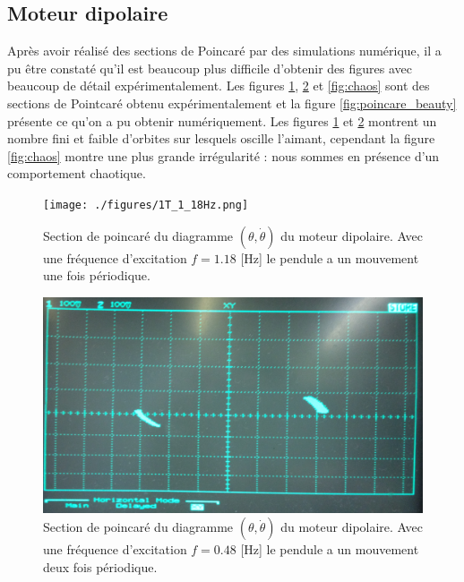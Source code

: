\documentclass[a4paper,12pt,oneside]{article}
\begin{document}
\subsection{Moteur dipolaire}

Après avoir réalisé des sections de Poincaré par des simulations numérique, il a pu être constaté qu'il est beaucoup plus difficile d'obtenir des figures avec beaucoup de détail expérimentalement. Les figures \ref{fig:dipol1T}, \ref{fig:dipol2T} et \ref{fig:chaos} sont des sections de Pointcaré obtenu expérimentalement et la figure \ref{fig:poincare_beauty} présente ce qu'on a pu obtenir numériquement. Les figures \ref{fig:dipol1T} et \ref{fig:dipol2T} montrent un nombre fini et faible d'orbites sur lesquels oscille l'aimant, cependant la figure \ref{fig:chaos} montre une plus grande irrégularité : nous sommes en présence d'un comportement chaotique.






\begin{figure}[h!]
  \begin{center}
  \texttt{[image: ./figures/1T\_1\_18Hz.png]}
  \caption{Section de poincaré du diagramme $(\theta,\dot{\theta})$ du moteur dipolaire. Avec une fréquence d'excitation $f=1.18$ [Hz] le pendule a un mouvement une fois périodique.} \label{fig:dipol1T}
  \end{center}
\end{figure}

\begin{figure}[h!]
  \begin{center}
  \includegraphics[width=0.5\linewidth,angle=0]{./figures/2T_0_48Hz.png}
  \caption{Section de poincaré du diagramme $(\theta,\dot{\theta})$ du moteur dipolaire. Avec une fréquence d'excitation $f=0.48$ [Hz] le pendule a un mouvement deux fois périodique.} \label{fig:dipol2T}
  \end{center}
\end{figure}
\end{document}
